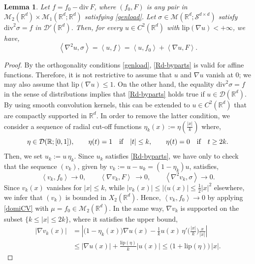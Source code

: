 \documentclass[11pt,letterpaper,reqno]{amsart}
\newtheorem{lemma}[theorem]{Lemma}
\theoremstyle{definition}
\numberwithin{equation}{section}
\newcommand{\R}{\mathbb{R}}
\newcommand{\Mes}{{\mathcal{M}}}
\newcommand{\dive}{{\mathrm{div}}}
\newcommand{\pairing}[1]{{\left \langle #1 \right \rangle}}
\newcommand{\abs}[1]{{\left \lvert #1 \right \rvert}}
\newcommand{\Lip}{{\mathrm{lip}}}
\newcommand{\D}{\mathcal{D}}
\newcommand{\Sdd}{{\mathcal{S}^{d \times d}}}
\begin{document}
{\begin{lemma}\label{lemma:byparts}  Let  $f = f_0 - \dive\, F$, where
 $(f_0, F)$ is any pair in $\Mes_2(\R^d)\times\Mes_1(\R^d;\R^d)$ satisfying \eqref{genload}. Let $\sigma \in \Mes(\R^d;\Sdd)$ 
 satisfy  $\dive^2 \sigma = f$ in  $\D'(\R^d)$.
 Then, for every $u\in C^2(\R^d)$ with $\Lip(\nabla u)<+\infty$, we have,
\begin{equation}\label{Rd-byparts}
 { \pairing {\nabla^2 u, \sigma}}  =   \pairing{u,f}  = \pairing{u,f_0} + \pairing{\nabla u, F}.
\end{equation}
\end{lemma}
\begin{proof} By the orthogonality conditions \eqref{genload}, \eqref{Rd-byparts} is valid for affine functions. Therefore, it is not restrictive to assume that $u$ and $\nabla u$ vanish at $0$; we may also assume that $\Lip(\nabla u)\le 1$.
On the other hand, the  equality $\dive^2\sigma=f$ in the sense of distributions implies that  \eqref{Rd-byparts} holds true if $u\in \D(\R^d)$. By using smooth convolution kernels, this can be extended to $u\in C^2(\R^d)$ that are compactly supported in $\R^d$. In order to remove the latter condition,   we consider a sequence of radial  cut-off functions $\eta_k(x) := \eta(\frac{|x|}{k})$ where,
 $$\eta\in \D(\R;[0,1]),\qquad \eta(t)=1 \quad \text{if\quad$|t|\le k$} ,\qquad \eta(t)=0 \quad \text{if\quad$t\ge 2k$}.$$
Then, we set $u_k := u\, \eta_k$.  Since  $u_k $  satisfies  \eqref{Rd-byparts}, we have only to check that the sequence $(v_k)$, given by $v_k := u- u_k= (1-\eta_k) u$,    satisfies,
\begin{equation}\label{claim-truncature}
\pairing{v_k,f_0}\to 0,\qquad \pairing{\nabla v_k,F}\ \to 0, \qquad \pairing{\nabla^2 v_k,\sigma} \to 0 .
\end{equation}
Since $v_k(x)$ vanishes for $|x|\le k$, while $|v_k(x)| \le |(u(x)| \le \frac1{2} |x|^2$  elsewhere, we infer that 
$(v_k)$ is bounded in $X_2(\R^d)$. Hence, $\pairing{v_k,f_0}\to 0 $ by applying \eqref{domiCV} with $\mu=f_0 \in \Mes_2(\R^d)$.
In the same way, $\nabla v_k$ is supported on the subset $\{k\le |x|\le 2k\}$, where it satisfies the upper bound,
\begin{align*}
	|\nabla v_k(x)| &= \left|\big(1-\eta_k(x)\big) \nabla u(x) -  \frac1{k}  u(x)\,  \eta' \Big(\frac{|x|}{k}\Big) \frac{x}{\abs{x}}\right| \\
	&\le |\nabla u(x)| + \frac{\Lip(\eta)}{k} |u(x)|  \le \big(1 +  \Lip(\eta)\big)\, |x| .
\end{align*}

\end{proof}}
\end{document}
